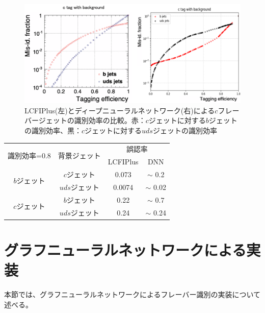 \begin{figure}[H]
	\begin{center}
 \includegraphics[keepaspectratio, scale=0.38]
 	{Figure/Flavortagging/dnneff_c.png}
 		\caption{LCFIPlus(左)とディープニューラルネットワーク(右)による$c$フレーバージェットの識別効率の比較。赤：$c$ジェットに対する$b$ジェットの識別効率、黒：$c$ジェットに対する$uds$ジェットの識別効率}
 		\label{dnneff_c}
	\end{center}
\end{figure}
\begin{table}[H]
 \centering
  \begin{tabular}{ |c|c|c|c|}
   \hline
   \multirow{2}{*}{識別効率=0.8} & \multirow{2}{*}{背景ジェット} & \multicolumn{2}{c|}{誤認率} \\ \cline{3-4} 
    & & LCFIPlus & DNN\\ \cline{3-4} 
    \hline
    \hline
   \multirow{2}{*}{$b$ジェット} & $c$ジェット & 0.073 & $\sim$ 0.2\\ \cline{2-2} 
   & $uds$ジェット & 0.0074 & $\sim$ 0.02 \\ \cline{1-2} 
   \multirow{2}{*}{$c$ジェット} & $b$ジェット & 0.22 & $\sim$ 0.7\\ \cline{2-2} 
   & $uds$ジェット & 0.24 & $\sim$ 0.24\\
   \hline
  \end{tabular}
  \label{dnneff80}
\end{table}

\section{グラフニューラルネットワークによる実装}
本節では、グラフニューラルネットワークによるフレーバー識別の実装について述べる。
